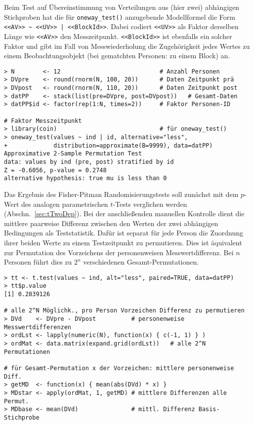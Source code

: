 Beim Test auf Übereinstimmung von Verteilungen aus (hier zwei) abhängigen Stichproben hat die für \lstinline!oneway_test()! anzugebende Modellformel die Form \lstinline!<<AV>> ~ <<UV>> | <<BlockId>>!. Dabei codiert \lstinline!<<UV>>! als Faktor derselben Länge wie \lstinline!<<AV>>! den Messzeitpunkt. \lstinline!<<BlockId>>! ist ebenfalls ein solcher Faktor und gibt im Fall von Messwiederholung die Zugehörigkeit jedes Wertes zu einem Beobachtungsobjekt (bei gematchten Personen: zu einem Block) an.
\begin{lstlisting}
> N        <- 12                            # Anzahl Personen
> DVpre    <- round(rnorm(N, 100, 20))      # Daten Zeitpunkt prä
> DVpost   <- round(rnorm(N, 110, 20))      # Daten Zeitpunkt post
> datPP    <- stack(list(pre=DVpre, post=DVpost))   # Gesamt-Daten
> datPP$id <- factor(rep(1:N, times=2))     # Faktor Personen-ID

# Faktor Messzeitpunkt
> library(coin)                             # für oneway_test()
> oneway_test(values ~ ind | id, alternative="less",
+             distribution=approximate(B=9999), data=datPP)
Approximative 2-Sample Permutation Test
data: values by ind (pre, post) stratified by id
Z = -0.6056, p-value = 0.2748
alternative hypothesis: true mu is less than 0
\end{lstlisting}

Das Ergebnis des Fisher-Pitman Randomisierungstests soll zunächst mit dem $p$-Wert des analogen parametrischen $t$-Tests verglichen werden (Abschn.\ \ref{sec:tTwoDep}). Bei der anschließenden manuellen Kontrolle dient die mittlere paarweise Differenz zwischen den Werten der zwei abhängigen Bedingungen als Teststatistik. Dafür ist separat für jede Person die Zuordnung ihrer beiden Werte zu einem Testzeitpunkt zu permutieren. Dies ist äquivalent zur Permutation des Vorzeichens der personenweisen Messwertdifferenz. Bei $n$ Personen führt dies zu $2^{n}$ verschiedenen Gesamt-Permutationen.
\begin{lstlisting}
> tt <- t.test(values ~ ind, alt="less", paired=TRUE, data=datPP)
> tt$p.value
[1] 0.2839126

# alle 2^N Möglichk., pro Person Vorzeichen Differenz zu permutieren
> DVd    <- DVpre - DVpost          # personenweise Messwertdifferenzen
> ordLst <- lapply(numeric(N), function(x) { c(-1, 1) } )
> ordMat <- data.matrix(expand.grid(ordLst))   # alle 2^N Permutationen

# für Gesamt-Permutation x der Vorzeichen: mittlere personenweise Diff.
> getMD  <- function(x) { mean(abs(DVd) * x) }
> MDstar <- apply(ordMat, 1, getMD) # mittlere Differenzen alle Permut.
> MDbase <- mean(DVd)               # mittl. Differenz Basis-Stichprobe
\end{lstlisting}

